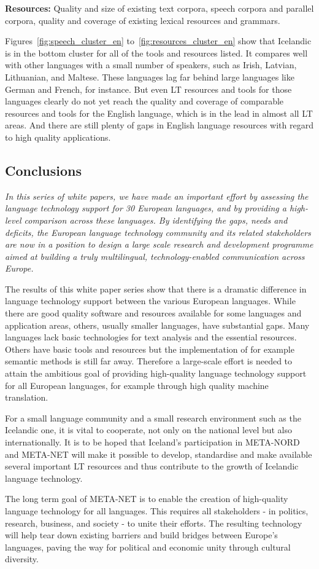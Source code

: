 \begin{multicols}{2}
\textbf{Resources:} Quality and size of existing text corpora, speech corpora and parallel corpora, quality and coverage of existing lexical resources and grammars.

Figures~\ref{fig:speech_cluster_en} to~\ref{fig:resources_cluster_en} show that Icelandic is in the bottom cluster for all of the tools and resources listed. It compares well with other languages with a small number of speakers, such as Irish, Latvian, Lithuanian, and Maltese. These languages lag far behind large languages like German and French, for instance. But even LT resources and tools for those languages clearly do not yet reach the quality and coverage of comparable resources and tools for the English language, which is in the lead in almost all LT areas. And there are still plenty of gaps in English language resources with regard to high quality applications.

\subsection{Conclusions}

\emph{In this series of white papers, we have made an important effort by assessing the language technology support for 30 European languages, and by providing a high-level comparison across these languages. By identifying the gaps, needs and deficits, the European language technology community and its related stakeholders are now in a position to design a large scale research and development programme aimed at building a truly multilingual, technology-enabled communication across Europe.}

The results of this white paper series show that there is a dramatic difference in language technology support between the various European languages. While there are good quality software and resources available for some languages and application areas, others, usually smaller languages, have substantial gaps. Many languages lack basic technologies for text analysis and the essential resources. Others have basic tools and resources but the implementation of for example semantic methods is still far away. Therefore a large-scale effort is needed to attain the ambitious goal of providing high-quality language technology support for all European languages, for example through high quality machine translation. 

For a small language community and a small research environment such as the Icelandic one, it is vital to cooperate, not only on the national level but also internationally. It is to be hoped that Iceland’s participation in META-NORD and META-NET will make it possible to develop, standardise and make available several important LT resources and thus contribute to the growth of Icelandic language technology.

The long term goal of META-NET is to enable the creation of high-quality language technology for all languages. This requires all stakeholders - in politics, research, business, and society - to unite their efforts. The resulting technology will help tear down existing barriers and build bridges between Europe’s languages, paving the way for political and economic unity through cultural diversity. 
\end{multicols}
